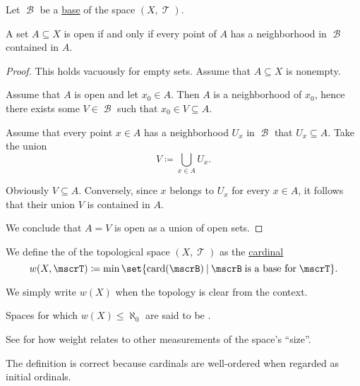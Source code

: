 \begin{proposition}\label{thm:set_open_iff_neighborhood_is_contained}
  Let \( \mscrB \) be a \hyperref[def:topological_base]{base} of the space \( (X, \mscrT) \).

  A set \( A \subseteq X \) is open if and only if every point of \( A \) has a neighborhood in \( \mscrB \) contained in \( A \).
\end{proposition}
\begin{proof}
  This holds vacuously for empty sets. Assume that \( A \subseteq X \) is nonempty.

  \SufficiencySubProof Assume that \( A \) is open and let \( x_0 \in A \). Then \( A \) is a neighborhood of \( x_0 \), hence there exists some \( V \in \mscrB \) such that \( x_0 \in V \subseteq A \).

  \NecessitySubProof Assume that every point \( x \in A \) has a neighborhood \( U_x \) in \( \mscrB \) that \( U_x \subseteq A \). Take the union
  \begin{equation*}
    V \coloneqq \bigcup_{x \in A} U_x.
  \end{equation*}

  Obviously \( V \subseteq A \). Conversely, since \( x \) belongs to \( U_x \) for every \( x \in A \), it follows that their union \( V \) is contained in \( A \).

  We conclude that \( A = V \) is open as a union of open sets.
\end{proof}

\begin{definition}\label{def:topological_space_weight}
  We define the  of the topological space \( (X, \mscrT) \) as the \hyperref[def:cardinal]{cardinal}
  \begin{equation*}
    w(X, \mscrT) \coloneqq \min \set{ \card(\mscrB) \given \mscrB \T{is a base for} \mscrT }.
  \end{equation*}

  We simply write \( w(X) \) when the topology is clear from the context.

  Spaces for which \( w(X) \leq \hyperref[def:aleph_hierarchy]{\aleph_0} \) are said to be .

  See  for how weight relates to other measurements of the space's \enquote{size}.
\end{definition}
\begin{defproof}
  The definition is correct because cardinals are well-ordered when regarded as initial ordinals.
\end{defproof}

